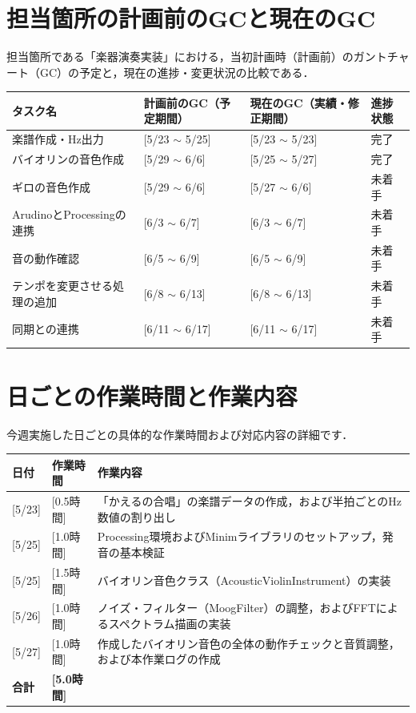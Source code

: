 \documentclass[uplatex,dvipdfmx]{jlreq}
\begin{document}
\section{担当箇所の計画前のGCと現在のGC}
担当箇所である「楽器演奏実装」における，当初計画時（計画前）のガントチャート（GC）の予定と，現在の進捗・変更状況の比較である．
\begin{table}[H]
    \centering
    \small
    \begin{tabular}{lp{4cm}p{4cm}l}
        \toprule
        タスク名 & 計画前のGC（予定期間） & 現在のGC（実績・修正期間） & 進捗状態 \\
        \midrule
        楽譜作成・Hz出力 & [5/23 $\sim$ 5/25] & [5/23 $\sim$ 5/23] & 完了 \\
        バイオリンの音色作成 & [5/29 $\sim$ 6/6] & [5/25 $\sim$ 5/27] & 完了 \\
        ギロの音色作成 & [5/29 $\sim$ 6/6] & [5/27 $\sim$ 6/6] & 未着手 \\
        ArudinoとProcessingの連携 & [6/3 $\sim$ 6/7] & [6/3 $\sim$ 6/7] & 未着手 \\
        音の動作確認 & [6/5 $\sim$ 6/9] & [6/5 $\sim$ 6/9] & 未着手 \\
        テンポを変更させる処理の追加 & [6/8 $\sim$ 6/13] & [6/8 $\sim$ 6/13] & 未着手 \\
        同期との連携 & [6/11 $\sim$ 6/17] & [6/11 $\sim$ 6/17] & 未着手 \\
        \bottomrule
    \end{tabular}
\end{table}
\section{日ごとの作業時間と作業内容}
今週実施した日ごとの具体的な作業時間および対応内容の詳細です．
\begin{table}[H]
    \centering
    \small
    \begin{tabular}{lll}
        \toprule
        日付 & 作業時間 & 作業内容 \\
        \midrule
        {}[5/23] & [0.5時間] &「かえるの合唱」の楽譜データの作成，および半拍ごとのHz数値の割り出し \\
        {}[5/25] & [1.0時間] & Processing環境およびMinimライブラリのセットアップ，発音の基本検証 \\
        {}[5/25] & [1.5時間] & バイオリン音色クラス（AcousticViolinInstrument）の実装  \\
        {}[5/26] & [1.0時間] & ノイズ・フィルター（MoogFilter）の調整，およびFFTによるスペクトラム描画の実装  \\
        {}[5/27] & [1.0時間] & 作成したバイオリン音色の全体の動作チェックと音質調整，および本作業ログの作成  \\
        \midrule
        \textbf{合計} & \textbf{[5.0時間]} & \\
        \bottomrule
    \end{tabular}
\end{table}
\end{document}
